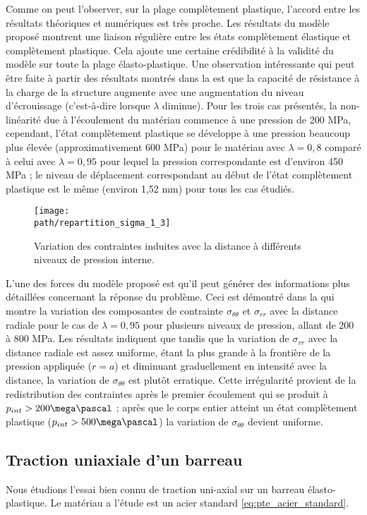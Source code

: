 \documentclass[10pt]{book}
\def\path{./fig}
\begin{document}
Comme on peut l'observer, sur la plage complètement plastique, l'accord entre les résultats théoriques et numériques est très proche. Les résultats du modèle proposé montrent une liaison régulière entre les états complètement élastique et complètement plastique. Cela ajoute une certaine crédibilité à la validité du modèle sur toute la plage élasto-plastique. Une observation intéressante qui peut être faite à partir des résultats montrés dans la  est que la capacité de résistance à la charge de la structure augmente avec une augmentation du niveau d'écrouissage (c'est-à-dire lorsque $\lambda$ diminue). Pour les trois cas présentés, la non-linéarité due à l'écoulement du matériau commence à une pression de 200 MPa, cependant, l'état complètement plastique se développe à une pression beaucoup plus élevée (approximativement 600 MPa) pour le matériau avec $\lambda = 0,8$ comparé à celui avec $\lambda = 0,95$ pour lequel la pression correspondante est d'environ 450 MPa ; le niveau de déplacement correspondant au début de l'état complètement plastique est le même (environ 1,52 mm) pour tous les cas étudiés.

\begin{figure}[h!]
\centering \texttt{[image: \\path/repartition\_sigma\_1\_3]}
\caption{Variation des contraintes induites avec la distance à différents niveaux de pression interne.}
\label{fig:repartition_sigma_1_3}
\end{figure}
L'une des forces du modèle proposé est qu'il peut générer des informations plus détaillées concernant la réponse du problème. Ceci est démontré dans la  qui montre la variation des composantes de contrainte $\sigma_{\theta\theta}$ et $\sigma_{rr}$ avec la distance radiale pour le cas de $\lambda = 0,95$ pour plusieurs niveaux de pression, allant de 200 à 800 MPa. Les résultats indiquent que tandis que la variation de $\sigma_{rr}$ avec la distance radiale est assez uniforme, étant la plus grande à la frontière de la pression appliquée ($r = a$) et diminuant graduellement en intensité avec la distance, la variation de $\sigma_{\theta\theta}$ est plutôt erratique. Cette irrégularité provient de la redistribution des contraintes après le premier écoulement qui se produit à $p_{int} > 200\mega\pascal$ ; après que le corps entier atteint un état complètement plastique ($p_{int} > 500\mega\pascal$) la variation de $\sigma_{\theta\theta}$ devient uniforme.
\subsection{Traction uniaxiale d'un barreau}
Nous étudions l'essai bien connu de traction uni-axial sur un barreau élasto-plastique. Le matériau a l'étude est un acier standard \eqref{eq:pte_acier_standard}.
\end{document}
